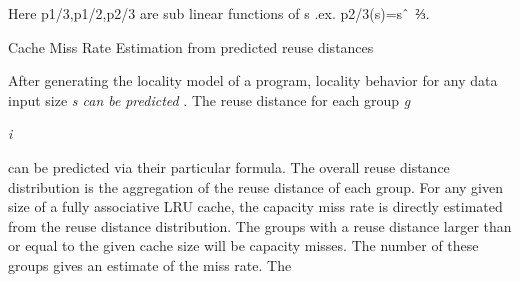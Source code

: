\documentclass[12pt]{article}
\begin{document}
\vspace{\baselineskip}

\vspace{\baselineskip}

\vspace{\baselineskip}

\vspace{\baselineskip}

\vspace{\baselineskip}

\vspace{\baselineskip}

\vspace{\baselineskip}

\vspace{\baselineskip}
{\fontsize{11pt}{13.2pt}\selectfont \textcolor[HTML]{333333}{Here p1/3,p1/2,p2/3 are sub linear functions of s .ex. p2/3(s)=s$ \string^ $ ⅔.}\par}\par


\vspace{\baselineskip}

\vspace{\baselineskip}
{\fontsize{16pt}{19.2pt}\selectfont Cache Miss Rate Estimation from predicted reuse distances\par}\par


\vspace{\baselineskip}
\begin{adjustwidth}{0.0in}{0.17in}
{\fontsize{10pt}{12.0pt}\selectfont \textcolor[HTML]{333333}{After generating the locality model of a program, locality behavior for any data input size \textit{s can be} \textit{predicted }. The reuse distance for each group\textit{ g}}{\fontsize{7pt}{8.4pt}\selectfont \textit{\textcolor[HTML]{333333}{i}}{\fontsize{10pt}{12.0pt}\selectfont \textit{\textcolor[HTML]{333333}{ }}\textcolor[HTML]{333333}{can be predicted via their particular formula. The\textit{ }overall reuse distance distribution is the aggregation of the reuse distance of each group. For any given size of a fully associative LRU cache, the capacity miss rate is directly estimated from the reuse distance distribution. The groups with a reuse distance larger than or equal to the given cache size will be capacity misses. The number of these groups gives an estimate of the miss rate. The}\par}\par}\par}\par

\end{adjustwidth}
\end{document}
